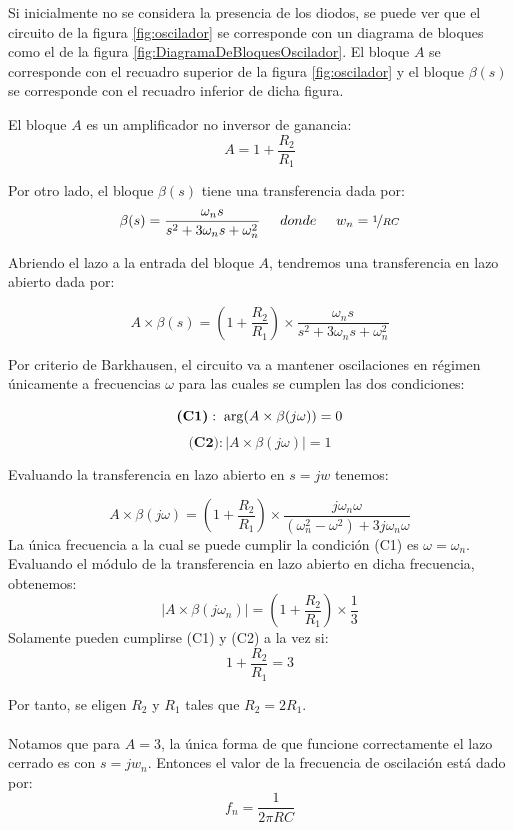 Si inicialmente no se considera la presencia de los diodos, se puede ver que el circuito de la figura \ref{fig:oscilador} se corresponde con un diagrama de bloques como el de la figura \ref{fig:DiagramaDeBloquesOscilador}. El bloque $A$ se corresponde con el recuadro superior de la figura \ref{fig:oscilador} y el bloque $\beta(s)$ se corresponde con el recuadro inferior de dicha figura.



El bloque $A$ es un amplificador no inversor de ganancia:
 $$A=1+\frac{R_2}{R_1}$$

 Por otro lado, el bloque $\beta(s)$ tiene una transferencia dada por:
\begin{equation*}
\beta(s)=\frac{\omega_n s}{s^2+3\omega_ns+\omega_n ^2} \hspace{0.5cm}donde\hspace{0.5cm} w_n=\nicefrac{1}{RC}
\end{equation*}

Abriendo el lazo a la entrada del bloque $A$, tendremos una transferencia en lazo abierto dada por:

$$A\times \beta(s) = \left( 1+\frac{R_2}{R_1}\right) \times \frac{\omega_n s}{s^2+3\omega_ns+\omega_n ^2} $$

Por criterio de Barkhausen, el circuito va a mantener oscilaciones en régimen únicamente a frecuencias $\omega$ para las cuales se cumplen las dos condiciones:

$$\textbf{(C1)}: \hspace{0.1cm}\arg\left(A\times \beta(j\omega)\right)=0$$
$$\textbf{(C2)}: \left| A\times \beta(j\omega)\right| =1$$

Evaluando la transferencia en lazo abierto en $s=jw$ tenemos:

$$A\times \beta(j\omega) = \left( 1+\frac{R_2}{R_1}\right) \times \frac{j\omega_n\omega}{(\omega_n ^2-\omega ^2) +3j\omega_n\omega} $$
La única frecuencia a la cual se puede cumplir la condición (C1) es $\omega= \omega_n$. Evaluando el módulo de la transferencia en lazo abierto en dicha frecuencia, obtenemos:
$$\left| A\times \beta(j\omega_n)\right|  = \left( 1+\frac{R_2}{R_1}\right)\times\frac{1}{3}$$
Solamente pueden cumplirse (C1) y (C2) a la vez si:
\begin{equation}
1+\frac{R_2}{R_1}=3
\label{eq:relacion3}
\end{equation}

Por tanto, se eligen $R_2$ y $R_1$ tales que $R_2=2R_1$.\\\\
Notamos que para $A=3$, la única forma de que funcione correctamente el lazo cerrado es con $s=jw_n$. Entonces el valor de la frecuencia de oscilación está dado por: 
$$f_n=\frac{1}{2\pi RC}$$

